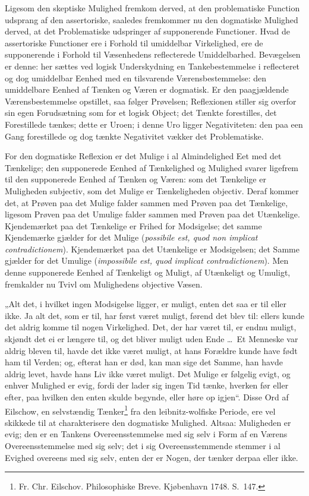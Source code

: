 \documentclass[12pt]{book}
\newcommand{\opage}[1]{\marginnote{\footnotesize\textit{[#1]}}}
\begin{document}
Ligesom den skeptiske Mulighed fremkom derved, at den problematiske Function udsprang af den assertoriske, saaledes fremkommer nu den dogmatiske Mulighed derved, at det Problematiske udspringer af supponerende Functioner. Hvad de assertoriske Functioner ere i Forhold til umiddelbar Virkelighed, ere de supponerende i Forhold til Væsenhedens reflecterede Umiddelbarhed. Bevægelsen er denne: her sættes ved logisk Underskydning en Tankebestemmelse i reflecteret og dog umiddelbar Eenhed med en tilsvarende Værensbestemmelse: den umiddelbare Eenhed af Tænken og Væren er dogmatisk. Er den paagjældende Værensbestemmelse opstillet, saa følger Prøvelsen; Reflexionen stiller sig overfor sin egen Forudsætning som for et logisk Object; det Tænkte forestilles, det Forestillede tænkes; dette er Uroen; i denne Uro ligger Negativiteten: den paa een Gang forestillede og dog tænkte Negativitet vækker det Problematiske.

For den dogmatiske Reflexion er det Mulige i al Almindelighed Eet med det Tænkelige; den supponerede Eenhed af Tænkelighed og Mulighed svarer ligefrem til den supponerede Eenhed af Tænken og Væren: som det Tænkelige er Muligheden subjectiv, som det Mulige er Tænkeligheden objectiv. Deraf kommer det, at Prøven paa det Mulige falder sammen med Prøven paa det Tænkelige, ligesom Prøven paa det Umulige falder sammen med Prøven paa det Utænkelige. Kjendemærket paa det Tænkelige er Frihed for Modsigelse; det samme Kjendemærke gjælder for det Mulige (\textit{possibile est, quod non implicat contradictionem}). Kjendemærket paa det Utænkelige er Modsigelsen; det Samme gjælder for det Umulige (\textit{impossibile est, quod implicat contradictionem}). Men denne supponerede Eenhed af Tænkeligt og Muligt, af Utænkeligt og Umuligt, fremkalder nu Tvivl om Mulighedens objective Væsen.

\opage{225}„Alt det, i hvilket ingen Modsigelse ligger, er muligt, enten det saa er til eller ikke. Ja alt det, som er til, har først været muligt, førend det blev til: ellers kunde det aldrig komme til nogen Virkelighed. Det, der har været til, er endnu muligt, skjøndt det ei er længere til, og det bliver muligt uden Ende \dots\ Et Menneske var aldrig bleven til, havde det ikke været muligt, at hans Forældre kunde have født ham til Verden; og, efterat han er død, kan man sige det Samme, han havde aldrig levet, havde hans Liv ikke været muligt. Det Mulige er følgelig evigt, og enhver Mulighed er evig, fordi der lader sig ingen Tid tænke, hverken før eller efter, paa hvilken den enten skulde begynde, eller høre op igjen“. Disse Ord af Eilschow, en selvstændig Tænker\footnote{Fr. Chr. Eilschov. Philosophiske Breve. Kjøbenhavn 1748. S.~147.}%
{} fra den leibnitz-wolfiske Periode, ere vel skikkede til at charakterisere den dogmatiske Mulighed. Altsaa: Muligheden er evig; den er en Tankens Overeensstemmelse med sig selv i Form af en Værens Overeensstemmelse med sig selv; det i sig Overeensstemmende stemmer i al Evighed overeens med sig selv, enten der er Nogen, der tænker derpaa eller ikke.
\end{document}
